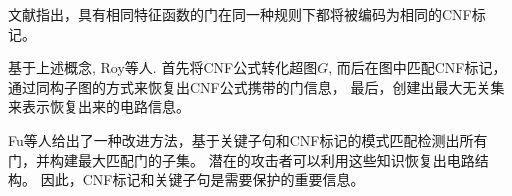 文献\cite{csRoy}指出，具有相同特征函数的门在同一种规则下都将被编码为相同的CNF标记。
%
%
%

基于上述概念,
Roy等人.\cite{csRoy}
首先将CNF公式转化超图$G$,
而后在图中匹配CNF标记，通过同构子图的方式来恢复出CNF公式携带的门信息，
最后，创建出最大无关集来表示恢复出来的电路信息。

Fu等人\cite{csFu}给出了一种改进方法，基于关键子句和CNF标记的模式匹配检测出所有门，并构建最大匹配门的子集。
%
%
潜在的攻击者可以利用这些知识恢复出电路结构。
因此，CNF标记和关键子句是需要保护的重要信息。

